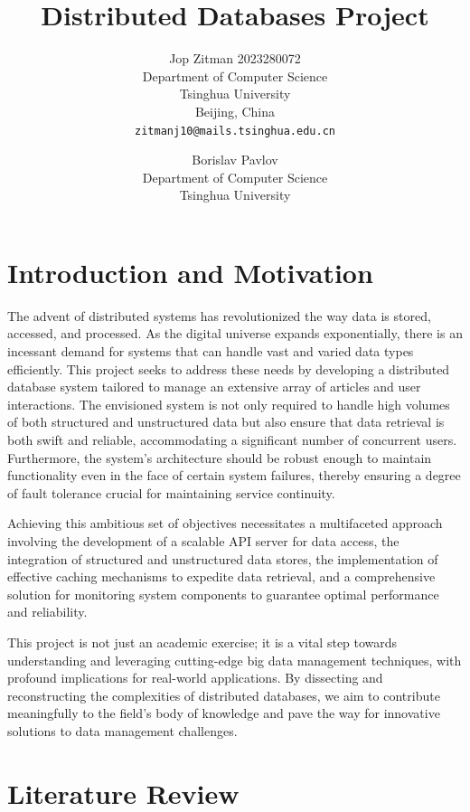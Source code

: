 \documentclass{report}
\title{Distributed Databases Project}
\author{
    Jop Zitman 2023280072\\
    Department of Computer Science\\
    Tsinghua University\\
    Beijing, China \\
    \texttt{zitmanj10@mails.tsinghua.edu.cn}
    \and
    Borislav Pavlov\\
    Department of Computer Science\\
    Tsinghua University\\
    \texttt{}
}
\begin{document}
    \maketitle

    \begin{abstract}
    \end{abstract}

    \tableofcontents

    \section{Introduction and Motivation}
    The advent of distributed systems has revolutionized the way data is stored, accessed, and processed. As the digital universe expands exponentially, there is an incessant demand for systems that can handle vast and varied data types efficiently. This project seeks to address these needs by developing a distributed database system tailored to manage an extensive array of articles and user interactions. The envisioned system is not only required to handle high volumes of both structured and unstructured data but also ensure that data retrieval is both swift and reliable, accommodating a significant number of concurrent users. Furthermore, the system's architecture should be robust enough to maintain functionality even in the face of certain system failures, thereby ensuring a degree of fault tolerance crucial for maintaining service continuity.

    Achieving this ambitious set of objectives necessitates a multifaceted approach involving the development of a scalable API server for data access, the integration of structured and unstructured data stores, the implementation of effective caching mechanisms to expedite data retrieval, and a comprehensive solution for monitoring system components to guarantee optimal performance and reliability.

    This project is not just an academic exercise; it is a vital step towards understanding and leveraging cutting-edge big data management techniques, with profound implications for real-world applications. By dissecting and reconstructing the complexities of distributed databases, we aim to contribute meaningfully to the field's body of knowledge and pave the way for innovative solutions to data management challenges.


    \section{Literature Review}
\end{document}
